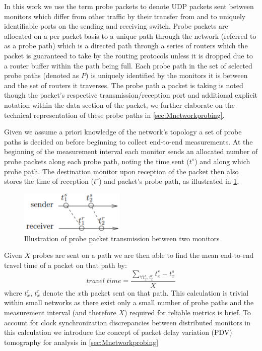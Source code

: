     In this work we use the term probe packets to denote UDP packets sent between monitors which differ from other traffic by their transfer from and to uniquely identifiable ports on the sending and receiving switch. Probe packets are allocated on a per packet basis to a unique path through the network (referred to as a probe path) which is a directed path through a series of routers which the packet is guaranteed to take by the routing protocols unless it is dropped due to a router buffer within the path being full. Each probe path in the set of selected probe paths (denoted as $P$) is uniquely identified by the monitors it is between and the set of routers it traverses. The probe path a packet is taking is noted though the packet's respective transmission/reception port and additional explicit notation within the data section of the packet, we further elaborate on the technical representation of these probe paths in \cref{sec:Mnetworkprobing}.\par
    
    Given we assume a priori knowledge of the network's topology a set of probe paths is decided on before beginning to collect end-to-end measurements. At the beginning of the measurement interval each monitor sends an allocated number of probe packets along each probe path, noting the time sent ($t^s$) and along which probe path. The destination monitor upon reception of the packet then also stores the time of reception ($t^r$) and packet's probe path, as illustrated in \ref{fig:pptransmission}. 
    \begin{figure}[H]
        \centering
        \includegraphics[width=5cm]{figs/probe_transmission.png}
        \caption[Illustration of probe packet transmission between two monitors]{Illustration of probe packet transmission between two monitors \protect\cite{he_fisher_2015}}
        \label{fig:pptransmission}
    \end{figure}
    Given $X$ probes are sent on a path we are then able to find the mean end-to-end travel time of a packet on that path by: \[travel\;time=\frac{\sum_{\forall  t_x^s, t_x^r}t_x^r - t_x^s}{X}\] where $t_x^r$, $t_x^r$ denote the $x$th packet sent on that path. This calculation is trivial within small networks as there exist only a small number of probe paths and the measurement interval (and therefore $X$) required for reliable metrics is brief. To account for clock synchronization discrepancies between distributed monitors in this calculation we introduce the concept of packet delay variation (PDV) tomography for analysis in \cref{sec:Mnetworkprobing} \par

